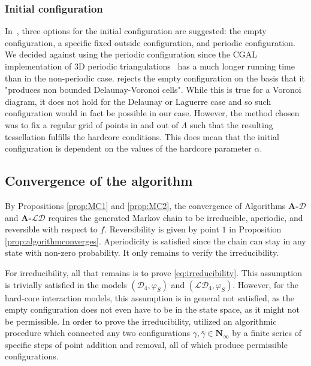 \subsubsection{Initial configuration}
In~\cite{DereudreLavancier2011}, three options for the initial configuration are suggested: the empty configuration, a specific fixed outside configuration, and periodic configuration.
We decided against using the periodic configuration since the CGAL implementation of 3D periodic triangulations~\cite{cgal:3d-period} has a much longer running time than in the non-periodic case. 
\cite{DereudreLavancier2011} rejects the empty configuration on the basis that it "produces non bounded Delaunay-Voronoi cells". While this is true for a Voronoi diagram, it does not hold for the Delaunay or Laguerre case and so such configuration would in fact be possible in our case.
However, the method chosen was to fix a regular grid of points in and out of $\Lambda$ such that the resulting tessellation fulfills the hardcore conditions. This does mean that the initial configuration is dependent on the values of the hardcore parameter $\alpha$. 



\subsection{Convergence of the algorithm}\label{sec:convergence}
By Propositions \ref{prop:MC1} and \ref{prop:MC2}, the convergence of Algorithms \textbf{A-}$\mathcal D$ and \textbf{A-}$\mathcal {LD}$ requires the generated Markov chain to be irreducible, aperiodic, and reversible with respect to $f$. Reversibility is given by point $1$ in Proposition \ref{prop:algorithmconverges}. Aperiodicity is satisfied since the chain can stay in any state with non-zero probability. It only remains to verify the irreducibility.

For irreducibility, all that remains is to prove \eqref{eq:irreducibility}. This assumption is trivially satisfied in the models $(\mathcal D_4,\varphi_S)$ and $(\mathcal {LD}_4,\varphi_S)$. However, for the hard-core interaction models, this assumption is in general not satisfied, as the empty configuration does not even have to be in the state space, as it might not be permissible. In order to prove the irreducibility, \cite{DereudreLavancier2011} utilized an algorithmic procedure which connected any two configurations $\gamma,\bar\gamma \in \mathbf N_\infty$ by a finite series of specific steps of point addition and removal, all of which produce permissible configurations.

